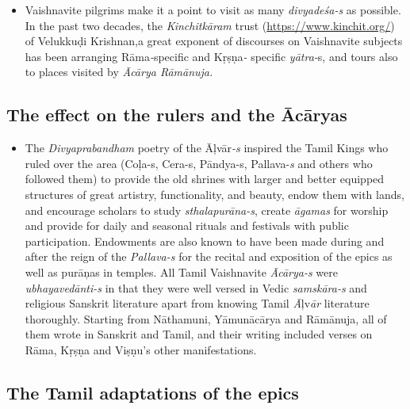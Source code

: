 \begin{itemize}
 \item Vaishnavite pilgrims make it a point to visit as many \textit{divyadeśa-s} as possible. In the past two decades, the \textit{Kinchitkāram} trust (\url{https://www.kinchit.org/}) of Velukkuḍi Krishnan,a great exponent of discourses on Vaishnavite subjects has been arranging Rāma\textit{-}specific and Kṛṣṇa\textit{-} specific \textit{yātra-}s, and tours also to places visited by \textit{Ācārya Rāmānuja.}

\end{itemize}


\subsection*{The effect on the rulers and the Ācāryas}

\begin{itemize}
\item The \textit{Divyaprabandham} poetry of the Āļvār\textit{-s} inspired the Tamil Kings who ruled over the area (Coļa-s, Cera-s, Pāndya-s, Pallava-\textit{s} and others who followed them) to provide the old shrines with larger and better equipped structures of great artistry, functionality, and beauty, endow them with lands, and encourage scholars to study \textit{sthalapurāna-s}, create \textit{āgamas} for worship and provide for daily and seasonal rituals and festivals with public participation. Endowments are also known to have been made during and after the reign of the \textit{Pallava-s} for the recital and exposition of the epics as well as purāņas in temples. All Tamil Vaishnavite \textit{Ācārya-s} were \textit{ubhayavedānti-s} in that they were well versed in Vedic \textit{samskāra-s} and religious Sanskrit literature apart from knowing Tamil \textit{Ā}ļv\textit{ār} literature thoroughly. Starting from Nāthamuni, Yāmunācārya and Rāmānuja, all of them wrote in Sanskrit and Tamil, and their writing included verses on Rāma, Kṛṣṇa and Viṣṇu’s other manifestations.

\end{itemize}


\subsection*{The Tamil adaptations of the epics}

